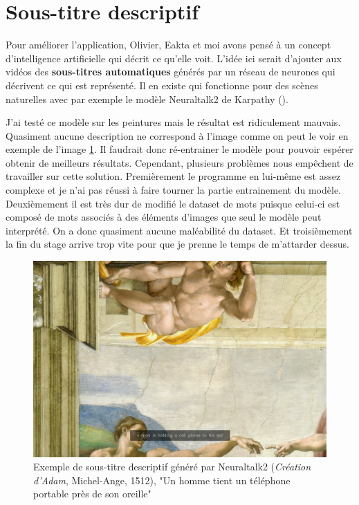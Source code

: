 \section{Sous-titre descriptif}

\par
Pour améliorer l'application, Olivier, Eakta et moi avons pensé à un concept d'intelligence artificielle qui décrit ce qu'elle voit. L'idée ici serait d'ajouter aux vidéos des \textbf{sous-titres automatiques} générés par un réseau de neurones qui décrivent ce qui est représenté. Il en existe qui fonctionne pour des scènes naturelles avec par exemple le modèle Neuraltalk2 de Karpathy \cite{neuraltalk2} ().

\par
J'ai testé ce modèle sur les peintures mais le résultat est ridiculement mauvais. Quasiment aucune description ne correspond à l'image comme on peut le voir en exemple de l'image \ref{fig:ex_neuraltalk}. Il faudrait donc ré-entrainer le modèle pour pouvoir espérer obtenir de meilleurs résultats. Cependant, plusieurs problèmes nous empêchent de travailler sur cette solution. Premièrement le programme en lui-même est assez complexe et je n'ai pas réussi à faire tourner la partie entrainement du modèle. Deuxièmement il est très dur de modifié le dataset de mots puisque celui-ci est composé de mots associés à des éléments d'images que seul le modèle peut interprété. On a donc quasiment aucune maléabilité du dataset. Et troisièmement la fin du stage arrive trop vite pour que je prenne le temps de m'attarder dessus.

\begin{figure}[ht]
  \centering
  \includegraphics[width=0.7\linewidth]{datas/exemple_sous_titre.png}
  \caption{Exemple de sous-titre descriptif généré par Neuraltalk2 (\emph{Création d'Adam}, Michel-Ange, 1512), "Un homme tient un téléphone portable près de son oreille"}
  \label{fig:ex_neuraltalk}
\end{figure}

